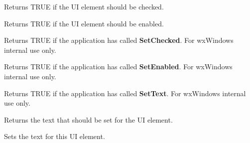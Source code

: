
Returns TRUE if the UI element should be checked.

\label{wxupdateuieventgetenabled}


Returns TRUE if the UI element should be enabled.

\label{wxupdateuieventgetsetchecked}


Returns TRUE if the application has called {\bf SetChecked}. For wxWindows internal use only.

\label{wxupdateuieventgetsetenabled}


Returns TRUE if the application has called {\bf SetEnabled}. For wxWindows internal use only.

\label{wxupdateuieventgetsettext}


Returns TRUE if the application has called {\bf SetText}. For wxWindows internal use only.

\label{wxupdateuieventgettext}


Returns the text that should be set for the UI element.

\label{wxupdateuieventsettext}


Sets the text for this UI element.

